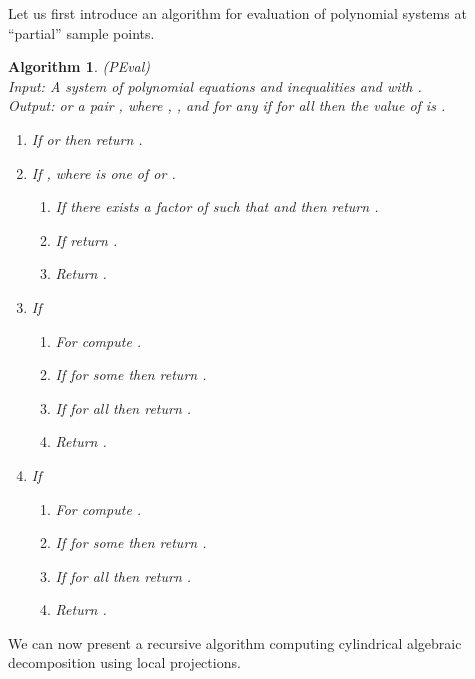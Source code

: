 \documentclass[english]{amsart}
\numberwithin{equation}{section}
\numberwithin{figure}{section}
\newtheorem{algorithm}[thm]{Algorithm}
\begin{document}
Let us first introduce an algorithm for evaluation of polynomial systems
at {}``partial'' sample points.
\begin{algorithm}
\label{alg:PEVAL}(PEval)\\
Input:\emph{ A system }\emph{ of polynomial
equations and inequalities and 
with .}\textup{}\\
\textup{\emph{Output:}}\textup{  or a pair ,
where , ,
and for any  if 
 for all  then the value of  is . }
\begin{enumerate}
\item If  or  then return .
\item If , where  is one of  or .

\begin{enumerate}
\item If there exists a factor  of  such that 
and  then return .
\item If  return .
\item Return .
\end{enumerate}
\item If 

\begin{enumerate}
\item For  compute .
\item If for some   then return .
\item If for all   then return .
\item Return .
\end{enumerate}
\item If 

\begin{enumerate}
\item For  compute .
\item If for some   then return .
\item If for all   then return .
\item Return .
\end{enumerate}
\end{enumerate}
\end{algorithm}
We can now present a recursive algorithm computing cylindrical algebraic
decomposition using local projections.
\end{document}

